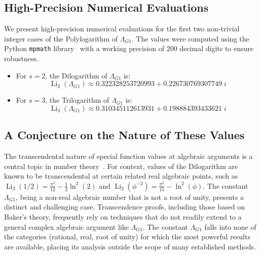 \documentclass{amsart}
\theoremstyle{plain}
\theoremstyle{definition}
\theoremstyle{remark}
\DeclareMathOperator{\Li}{Li}
\newcommand{\LambdaG}{\Lambda_{G1}}
\newcommand{\phiG}{\phi}
\begin{document}
\subsection{High-Precision Numerical Evaluations}
We present high-precision numerical evaluations for the first two non-trivial integer cases of the Polylogarithm of $\LambdaG$. The values were computed using the Python \texttt{mpmath} library~\cite{mpmath} with a working precision of 200 decimal digits to ensure robustness.
\begin{itemize}
    \item For $s=2$, the Dilogarithm of $\LambdaG$ is:
    \[ \Li_2(\LambdaG) \approx 0.322328253720993 + 0.226730769307749\;i \]
    
    \item For $s=3$, the Trilogarithm of $\LambdaG$ is:
    \[ \Li_3(\LambdaG) \approx 0.310345112613931 + 0.198884393433621\;i \]
    
\end{itemize}

\subsection{A Conjecture on the Nature of These Values}
The transcendental nature of special function values at algebraic arguments is a central topic in number theory~\cite{Baker}. For context, values of the Dilogarithm are known to be transcendental at certain related real algebraic points, such as $\Li_2(1/2) = \frac{\pi^2}{12} - \frac{1}{2}\ln^2(2)$ and $\Li_2(\phiG^{-2}) = \frac{\pi^2}{15} - \ln^2(\phiG)$. The constant $\LambdaG$, being a non-real algebraic number that is not a root of unity, presents a distinct and challenging case. Transcendence proofs, including those based on Baker's theory, frequently rely on techniques that do not readily extend to a general complex algebraic argument like $\LambdaG$. The constant $\LambdaG$ falls into none of the categories (rational, real, root of unity) for which the most powerful results are available, placing its analysis outside the scope of many established methods.
\end{document}
